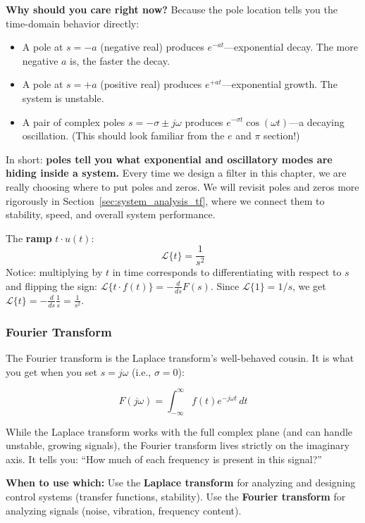\textbf{Why should you care right now?} Because the pole location tells you the time-domain behavior directly:
\begin{itemize}[nosep]
    \item A pole at $s = -a$ (negative real) produces $e^{-at}$---exponential decay. The more negative $a$ is, the faster the decay.
    \item A pole at $s = +a$ (positive real) produces $e^{+at}$---exponential growth. The system is unstable.
    \item A pair of complex poles $s = -\sigma \pm j\omega$ produces $e^{-\sigma t}\cos(\omega t)$---a decaying oscillation. (This should look familiar from the $e$ and $\pi$ section!)
\end{itemize}

In short: \textbf{poles tell you what exponential and oscillatory modes are hiding inside a system.} Every time we design a filter in this chapter, we are really choosing where to put poles and zeros. We will revisit poles and zeros more rigorously in Section~\ref{sec:system_analysis_tf}, where we connect them to stability, speed, and overall system performance.

The \textbf{ramp} $t \cdot u(t)$:
\[
\mathcal{L}\{t\} = \frac{1}{s^2}
\]
Notice: multiplying by $t$ in time corresponds to differentiating with respect to $s$ and flipping the sign: $\mathcal{L}\{t \cdot f(t)\} = -\frac{d}{ds}F(s)$. Since $\mathcal{L}\{1\} = 1/s$, we get $\mathcal{L}\{t\} = -\frac{d}{ds}\frac{1}{s} = \frac{1}{s^2}$.

\subsubsection{Fourier Transform}

The Fourier transform is the Laplace transform's well-behaved cousin. It is what you get when you set $s = j\omega$ (i.e., $\sigma = 0$):

\begin{equation}
F(j\omega) = \int_{-\infty}^{\infty} f(t) e^{-j\omega t} \, dt
\end{equation}

While the Laplace transform works with the full complex plane (and can handle unstable, growing signals), the Fourier transform lives strictly on the imaginary axis. It tells you: ``How much of each frequency is present in this signal?''

\textbf{When to use which:} Use the \textbf{Laplace transform} for analyzing and designing control systems (transfer functions, stability). Use the \textbf{Fourier transform} for analyzing signals (noise, vibration, frequency content).

